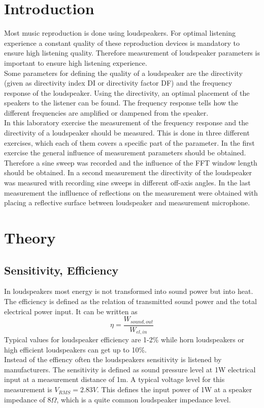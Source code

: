 \documentclass{article}
\begin{document}
\section{Introduction}
Most music reproduction is done using loudspeakers. For optimal listening experience a constant quality of these reproduction devices is mandatory to ensure high listening quality. Therefore measurement of loudspeaker parameters is important to ensure high listening experience.\\
Some parameters for defining the quality of a loudspeaker are the directivity (given as directivity index DI or directivity factor DF) and the frequency response of the loudspeaker. Using the directivity, an optimal placement of the speakers to the listener can be found. The frequency response tells how the different frequencies are amplified or dampened from the speaker.\\
In this laboratory exercise the measurement of the frequency response and the directivity of a loudspeaker should be measured. This is done in three different exercises, which each of them covers a specific part of the parameter. In the first exercise the general influence of measurement parameters should be obtained. Therefore a sine sweep was recorded and the influence of the FFT window length should be obtained. In a second measurement the directivity of the loudspeaker was measured with recording sine sweeps in different off-axis angles. In the last measurement the inflluence of reflections on the measurement were obtained with placing a reflective surface between loudspeaker and measurement microphone.
\section{Theory}
\subsection{Sensitivity, Efficiency}
In loudspeakers most energy is not transformed into sound power but into heat. The efficiency is defined as the relation of transmitted sound power and the total electrical power input. It can be written as
\begin{equation}
\eta=\frac{W_{sound,out}}{W_{el,in}}
\end{equation}
Typical values for loudspeaker efficiency are 1-2\% while horn loudspeakers or high efficient loudspeakers can get up to 10\%.\\
Instead of the effiency often the loudspeakers sensitivity is listened by manufacturers. The sensitivity is defined as sound pressure level at 1W electrical input at a measurement distance of 1m. A typical voltage level for this measurement is $V_{RMS}=2.83V$. This defines the input power of 1W at a speaker impedance of $8\Omega$, which is a quite common loudspeaker impedance level. 
\end{document}
